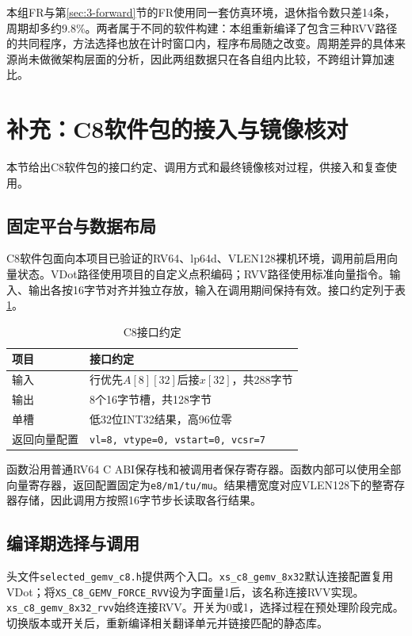 本组FR与第\ref{sec:3-forward}节的FR使用同一套仿真环境，退休指令数只差14条，周期却多约9.8\%。两者属于不同的软件构建：本组重新编译了包含三种RVV路径的共同程序，方法选择也放在计时窗口内，程序布局随之改变。周期差异的具体来源尚未做微架构层面的分析，因此两组数据只在各自组内比较，不跨组计算加速比。


\section{补充：C8软件包的接入与镜像核对}\label{sec:3-c8-sdk}
本节给出C8软件包的接口约定、调用方式和最终镜像核对过程，供接入和复查使用。

\subsection{固定平台与数据布局}

C8软件包面向本项目已验证的RV64、lp64d、VLEN128裸机环境，调用前启用向量状态。VDot路径使用项目的自定义点积编码；RVV路径使用标准向量指令。输入、输出各按16字节对齐并独立存放，输入在调用期间保持有效。接口约定列于表\ref{tab:3-c8-interface}。

\begin{table}[!htbp]\centering
\caption{C8接口约定}\label{tab:3-c8-interface}
\begin{tabular}{ll}
\toprule
项目 & 接口约定\\
\midrule
输入 & 行优先\(A[8][32]\)后接\(x[32]\)，共288字节\\
输出 & 8个16字节槽，共128字节\\
单槽 & 低32位INT32结果，高96位零\\
返回向量配置 & \texttt{vl=8, vtype=0, vstart=0, vcsr=7}\\
\bottomrule
\end{tabular}
\end{table}

函数沿用普通RV64 C ABI保存栈和被调用者保存寄存器。函数内部可以使用全部向量寄存器，返回配置固定为\texttt{e8/m1/tu/mu}。结果槽宽度对应VLEN128下的整寄存器存储，因此调用方按照16字节步长读取各行结果。

\subsection{编译期选择与调用}

头文件\texttt{selected\_gemv\_c8.h}提供两个入口。\texttt{xs\_c8\_gemv\_8x32}默认连接配置复用VDot；将\texttt{XS\_C8\_GEMV\_FORCE\_RVV}设为字面量1后，该名称连接RVV实现。\texttt{xs\_c8\_gemv\_8x32\_rvv}始终连接RVV。开关为0或1，选择过程在预处理阶段完成。切换版本或开关后，重新编译相关翻译单元并链接匹配的静态库。

